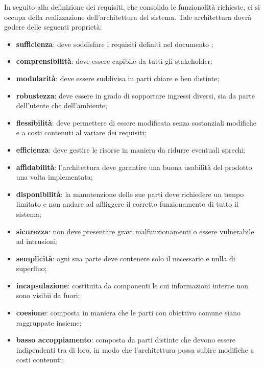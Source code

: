      	In seguito alla definizione dei requisiti, che consolida le funzionalità richieste, ci si occupa della realizzazione dell'architettura del sistema. Tale architettura dovrà godere delle seguenti proprietà: 
     	\begin{itemize}
     		\item{\textbf{sufficienza}}: deve soddisfare i requisiti definiti nel documento \AdR; 
     		\item{\textbf{comprensibilità}}: deve essere capibile da tutti gli stakeholder; 
     		\item{\textbf{modularità}}: deve essere suddivisa in parti chiare e ben distinte; 
     		\item{\textbf{robustezza}}: deve essere in grado di sopportare ingressi diversi, sia da parte dell'utente che dell'ambiente; 
     		\item{\textbf{flessibilità}}: deve permettere di essere modificata senza sostanziali modifiche e a costi contenuti al variare dei requisiti; 
     		\item{\textbf{efficienza}}: deve gestire le risorse in maniera da ridurre eventuali sprechi; 
     		\item{\textbf{affidabilità}}: l'architettura deve garantire una buona usabilità del prodotto una volta implementata; 
     		\item{\textbf{disponibilità}}: la manutenzione delle sue parti deve richiedere un tempo limitato e non andare ad affliggere il corretto funzionamento di tutto il sistema;
     		\item{\textbf{sicurezza}}: non deve presentare gravi malfunzionamenti o essere vulnerabile ad intrusioni; 
     		\item{\textbf{semplicità}}: ogni sua parte deve contenere solo il necessario e nulla di superfluo; 
     		\item{\textbf{incapsulazione}}: costituita da componenti le cui informazioni interne non sono visibii da fuori;
     		\item{\textbf{coesione}}: composta in maniera che le parti con obiettivo comune siano raggruppate insieme; 
     		\item{\textbf{basso accoppiamento}}: composta da parti distinte che devono essere indipendenti tra di loro, in modo che l'architettura possa subire modifiche a costi contenuti;   
     	\end{itemize}
	     

